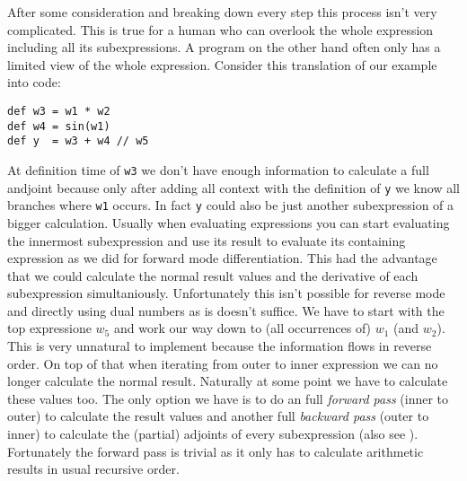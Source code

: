 After some consideration and breaking down every step this process isn't very complicated. This is true for a human who can overlook the whole expression including all its subexpressions. A program on the other hand often only has a limited view of the whole expression. Consider this translation of our example into code:
\begin{lstlisting}
def w3 = w1 * w2
def w4 = sin(w1)
def y  = w3 + w4 // w5
\end{lstlisting}
At definition time of \lstinline{w3} we don't have enough information to calculate a full andjoint because only after adding all context with the definition of \lstinline{y} we know all branches where \lstinline{w1} occurs. In fact \lstinline{y} could also be just another subexpression of a bigger calculation. Usually when evaluating expressions you can start evaluating the innermost subexpression and use its result to evaluate its containing expression as we did for forward mode differentiation. This had the advantage that we could calculate the normal result values and the derivative of each subexpression simultaniously. Unfortunately this isn't possible for reverse mode and directly using dual numbers as is doesn't suffice. We have to start with the top expressione $w_5$ and work our way down to (all occurrences of) $w_1$ (and $w_2$). This is very unnatural to implement because the information flows in reverse order. On top of that when iterating from outer to inner expression we can no longer calculate the normal result. Naturally at some point we have to calculate these values too. The only option we have is to do an full \emph{forward pass} (inner to outer) to calculate the result values and another full \emph{backward pass} (outer to inner) to calculate the (partial) adjoints of every subexpression (also see ). Fortunately the forward pass is trivial as it only has to calculate arithmetic results in usual recursive order.

